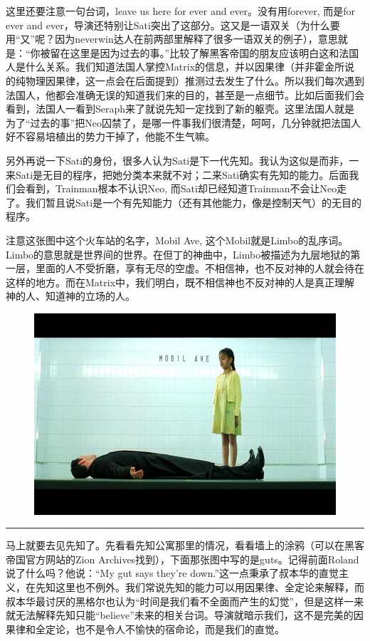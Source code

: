 \documentclass[UTF8]{ctexart}
\newcommand{\myparsep}{\noindent \rule[0.5ex]{\linewidth}{1pt}}
\begin{document}
这里还要注意一句台词，leave us here for ever and ever。没有用forever, 而是for ever and ever，导演还特别让Sati突出了这部分。这又是一语双关（为什么要用“又”呢？因为neverwin达人在前两部里解释了很多一语双关的例子），意思就是：“你被留在这里是因为过去的事。”比较了解黑客帝国的朋友应该明白这和法国人是什么关系。我们知道法国人掌控Matrix的信息，并以因果律（并非霍金所说的纯物理因果律，这一点会在后面提到）推测过去发生了什么。所以我们每次遇到法国人，他都会准确无误的知道我们来的目的，甚至是一点细节。比如后面我们会看到，法国人一看到Seraph来了就说先知一定找到了新的躯壳。这里法国人就是为了“过去的事”把Neo囚禁了，是哪一件事我们很清楚，呵呵，几分钟就把法国人好不容易培植出的势力干掉了，他能不生气嘛。

另外再说一下Sati的身份，很多人认为Sati是下一代先知。我认为这似是而非，一来Sati是无目的程序，把她分类本来就不对；二来Sati确实有先知的能力。后面我们会看到，Trainman根本不认识Neo, 而Sati却已经知道Trainman不会让Neo走了。我们暂且说Sati是一个有先知能力（还有其他能力，像是控制天气）的无目的程序。

注意这张图中这个火车站的名字，Mobil Ave, 这个Mobil就是Limbo的乱序词。Limbo的意思就是世界间的世界。在但丁的神曲中，Limbo被描述为九层地狱的第一层，里面的人不受折磨，享有无尽的空虚。不相信神，也不反对神的人就会待在这样的地方。而在Matrix中，我们明白，既不相信神也不反对神的人是真正理解神的人、知道神的立场的人。

\begin{figure}[htb]
\centering
\includegraphics[width=0.5\linewidth]{fig/e36b4a3679b53bdda3cc2b19.jpg}
\end{figure}

\myparsep

马上就要去见先知了。先看看先知公寓那里的情况，看看墙上的涂鸦（可以在黑客帝国官方网站的Zion Archives找到），下面那张图中写的是guts。记得前面Roland说了什么吗？他说：“My gut says they're down.”这一点秉承了叔本华的直觉主义，在先知这里也不例外。我们常说先知的能力可以用因果律、全定论来解释，而叔本华最讨厌的黑格尔也认为“时间是我们看不全面而产生的幻觉”，但是这样一来就无法解释先知只能“believe”未来的相关台词。导演就暗示我们，这不是完美的因果律和全定论，也不是令人不愉快的宿命论，而是我们的直觉。
\end{document}
